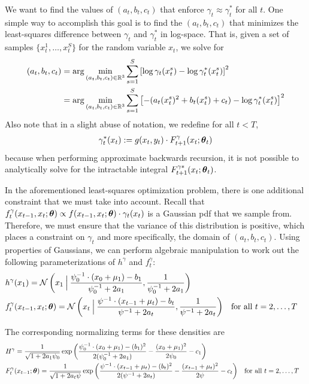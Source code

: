 \documentclass{article}
\begin{document}
We want to find the values of $(a_t, b_t, c_t)$ that enforce $\gamma_t \approx \gamma_t^*$ for all $t$.  One simple way to accomplish this goal is to find the $(a_t, b_t, c_t)$ that minimizes the least-squares difference between $\gamma_t$ and $\gamma_t^*$ in log-space.  That is, given a set of samples $\{x_t^1, \ldots, x_t^S\}$ for the random variable $x_t$, we solve for 
\begin{align*}
(a_t, b_t, c_t) &= \arg \min_{(a_t, b_t, c_t) \in \R^3} \sum_{s=1}^S \left[\log \gamma_t(x_t^s) - \log \gamma^*_t(x_t^s) \right]^2  \\
&=  \arg \min_{(a_t, b_t, c_t) \in \R^3} \sum_{s=1}^S \left[-(a_t (x_t^s)^2 + b_t (x_t^s) + c_t) - \log \gamma^*_t(x_t^s) \right]^2
\end{align*}
Also note that in a slight abuse of notation, we redefine for all $t < T$,
\begin{align*}
\gamma_t^*(x_t) := g(x_t, y_t) \cdot F^\gamma_{t+1}(x_t; \bd \theta_t) 
\end{align*}
because when performing approximate backwards recursion, it is not possible to analytically solve for the intractable integral $F^{\gamma*}_{t+1}(x_t; \bd \theta_t)$.    

In the aforementioned least-squares optimization problem, there is one additional constraint that we must take into account.  Recall that $f_t^{\gamma}(x_{t-1}, x_t; \bd \theta) \propto f(x_{t-1}, x_t; \bd \theta) \cdot \gamma_t(x_t)$ is a Gaussian pdf that we sample from.  Therefore, we must ensure that the variance of this distribution is positive, which places a constraint on $\gamma_t$ and more specifically, the domain of $(a_t, b_t, c_t)$.  Using properties of Gaussians, we can perform algebraic manipulation to work out the following parameterizations of $h^\gamma$ and $f_t^\gamma$:
\begin{align*}
& h^\gamma(x_1) = \Norm\left(x_1 \given[\Big] \frac{\psi_0^{-1} \cdot (x_0 + \mu_1) -b_1}{\psi_0^{-1} + 2a_1}, \frac{1}{\psi_0^{-1} + 2a_1}\right) \\
& f_t^\gamma(x_{t-1}, x_t; \bd \theta) = \Norm\left(x_t \given[\Big] \frac{\psi^{-1} \cdot (x_{t-1} + \mu_t) - b_t}{\psi^{-1} + 2a_t}, \frac{1}{\psi^{-1} + 2a_t}\right) & & \text{for all } t = 2, \ldots, T
\end{align*}

\noindent The corresponding normalizing terms for these densities are 
\begin{align*}
& H^\gamma = \frac{1}{\sqrt{1 + 2a_1 \psi_0}} \exp\left(\frac{\psi_0^{-1} \cdot (x_0 + \mu_1)  - (b_1)^2}{2(\psi_0^{-1} + 2a_1)} - \frac{ (x_0 + \mu_1)^2}{2 \psi_0} - c_1\right) \\
& F^\gamma_{t}(x_{t-1}; \bd \theta) =  \frac{1}{\sqrt{1 + 2a_t \psi}} \exp\left(\frac{\psi^{-1} \cdot (x_{t-1} + \mu_t)  - (b_t)^2}{2(\psi^{-1} + 2 a_t)} - \frac{(x_{t-1} + \mu_t)^2}{2\psi} - c_t\right) & & \text{for all } t = 2, \ldots, T
\end{align*}
\end{document}
